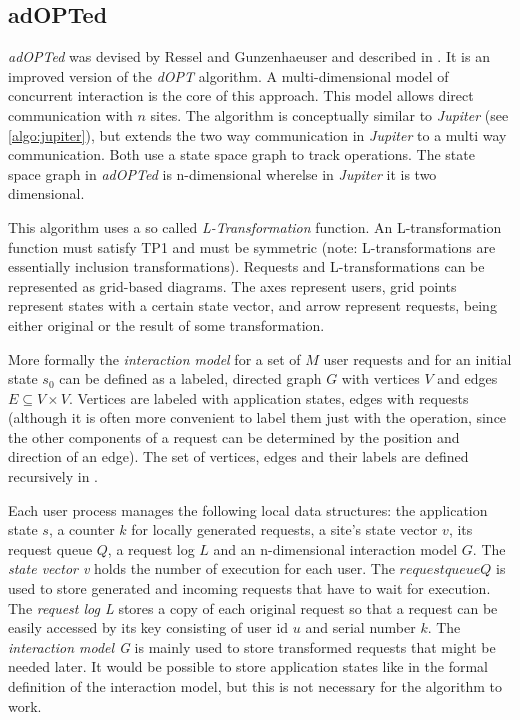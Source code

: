 \subsection{adOPTed}
\label{algo:adopted}

\emph{adOPTed} was devised by Ressel and Gunzenhaeuser and described in \cite{ressel96}. It is an improved version of the \emph{dOPT} algorithm. A multi-dimensional model of concurrent interaction is the core of this approach. This model allows direct communication with $n$ sites. The algorithm is conceptually similar to \emph{Jupiter} (see \ref{algo:jupiter}), but extends the two way communication in \emph{Jupiter} to a multi way communication. Both use a state space graph to track operations. The state space graph in \emph{adOPTed} is n-dimensional wherelse in \emph{Jupiter} it is two dimensional.

This algorithm uses a so called \emph{L-Transformation} function. An L-transformation function must satisfy TP1 and must be symmetric (note: L-transformations are essentially inclusion transformations). Requests and L-transformations can be represented as grid-based diagrams. The axes represent users, grid points represent states with a certain state vector, and arrow represent requests, being either original or the result of some transformation.

More formally the \emph{interaction model} for a set of $M$ user requests and for an initial state $s_{0}$ can be defined as a labeled, directed graph $G$ with vertices $V$ and edges $E \subseteq V \times V$. Vertices are labeled with application states, edges with requests (although it is often more convenient to label them just with the operation, since the other components of a request can be determined by the position and direction of an edge). The set of vertices, edges and their labels are defined recursively in \cite{ressel96}.

Each user process manages the following local data structures: the application state $s$, a counter $k$ for locally generated requests, a site's state vector $v$, its request queue $Q$, a request log $L$ and an n-dimensional interaction model $G$. The \emph{state vector v} holds the number of execution for each user. The $request queue Q$ is used to store generated and incoming requests that have to wait for execution. The \emph{request log L} stores a copy of each original request so that a request can be easily accessed by its key consisting of user id $u$ and serial number $k$. The \emph{interaction model G} is mainly used to store transformed requests that might be needed later. It would be possible to store application states like in the formal definition of the interaction model, but this is not necessary for the algorithm to work.


